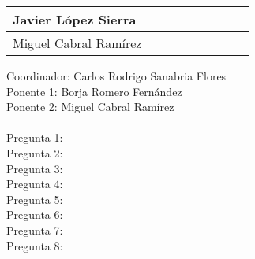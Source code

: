 \begin{table}[h]
{\begin{tabular}{|l|l|l|l|l|l|l|l|l|}
Javier López Sierra                                                &                                                                  &                                                                  &                                                                  &                                                                  &                                                                  &                                                                  &                                                                  &                                                                  \\ \hline
Miguel Cabral Ramírez                                              &                                                                  &                                                                  &                                                                  &                                                                  &                                                                  &                                                                  &                                                                  &                                                                  \\ \hline
\end{tabular}%
}
\end{table}
\noindent
Coordinador: Carlos Rodrigo Sanabria Flores \\
Ponente 1: Borja Romero Fernández \\
Ponente 2: Miguel Cabral Ramírez \\
\bigskip \\
Pregunta 1: \\
Pregunta 2: \\
Pregunta 3: \\
Pregunta 4: \\
Pregunta 5: \\
Pregunta 6: \\
Pregunta 7: \\
Pregunta 8: \\